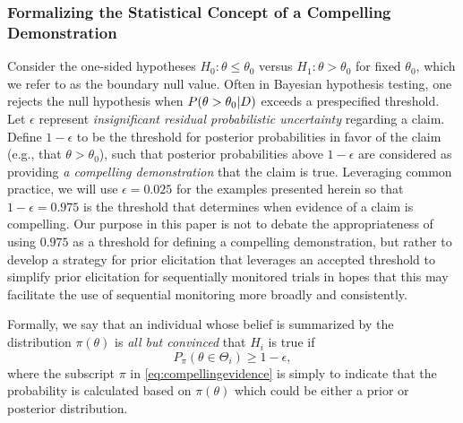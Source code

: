 \documentclass[AMA,STIX1COL,doublespace]{WileyNJD-v2}
\begin{document}

\subsubsection{Formalizing the Statistical Concept of a Compelling Demonstration}\label{sec:sub_evid}
Consider the one-sided hypotheses $H_0: \theta \le \theta_0$ versus $H_1: \theta > \theta_0$ for fixed $\theta_0$, which we refer to as the boundary null value.
Often in Bayesian hypothesis testing, one rejects the null hypothesis when $P(\theta > \theta_0 |\boldmath{D})$ exceeds 
a prespecified threshold.
%
Let $\epsilon$ represent \textit{insignificant residual probabilistic uncertainty} regarding a claim. 
 Define $1-\epsilon$ to be the threshold for posterior probabilities in favor of the claim 
(e.g., that $\theta > \theta_0$), such that posterior probabilities above $1-\epsilon$ are considered as providing \textit{a compelling demonstration} 
that the claim is true. 
%
Leveraging common practice, we will use $\epsilon=0.025$ for the examples presented herein 
so that $1-\epsilon=0.975$ is the threshold that determines when evidence of a claim is compelling.
%
Our purpose in this paper is not to debate the appropriateness of using $0.975$ as a threshold for defining a compelling demonstration, but rather to develop a strategy for prior elicitation that leverages an accepted threshold to simplify prior elicitation for sequentially monitored trials in hopes that this may facilitate the use of sequential monitoring more broadly and consistently.

Formally, we say that an individual whose belief is summarized by the distribution $\pi\left(\theta\right)$ is \textit{all but convinced} that $H_i$ is true if 
\begin{equation}\label{eq:compellingevidence}
		P_\pi(\theta\in\Theta_i)\geq 1-\epsilon,
\end{equation} 
where the subscript $\pi$ in \eqref{eq:compellingevidence} is simply to indicate that the probability is calculated based on $\pi\left(\theta\right)$ which could be either a prior
or posterior distribution.
\end{document}
